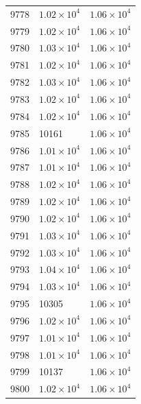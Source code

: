 \begin{table}[H]
\begin{tabular}{lll}
9778 & $\displaystyle 1.02 \times 10^{4}$ & $\displaystyle 1.06 \times 10^{4}$ \\
9779 & $\displaystyle 1.02 \times 10^{4}$ & $\displaystyle 1.06 \times 10^{4}$ \\
9780 & $\displaystyle 1.03 \times 10^{4}$ & $\displaystyle 1.06 \times 10^{4}$ \\
9781 & $\displaystyle 1.02 \times 10^{4}$ & $\displaystyle 1.06 \times 10^{4}$ \\
9782 & $\displaystyle 1.03 \times 10^{4}$ & $\displaystyle 1.06 \times 10^{4}$ \\
9783 & $\displaystyle 1.02 \times 10^{4}$ & $\displaystyle 1.06 \times 10^{4}$ \\
9784 & $\displaystyle 1.02 \times 10^{4}$ & $\displaystyle 1.06 \times 10^{4}$ \\
9785 & 10161 & $\displaystyle 1.06 \times 10^{4}$ \\
9786 & $\displaystyle 1.01 \times 10^{4}$ & $\displaystyle 1.06 \times 10^{4}$ \\
9787 & $\displaystyle 1.01 \times 10^{4}$ & $\displaystyle 1.06 \times 10^{4}$ \\
9788 & $\displaystyle 1.02 \times 10^{4}$ & $\displaystyle 1.06 \times 10^{4}$ \\
9789 & $\displaystyle 1.02 \times 10^{4}$ & $\displaystyle 1.06 \times 10^{4}$ \\
9790 & $\displaystyle 1.02 \times 10^{4}$ & $\displaystyle 1.06 \times 10^{4}$ \\
9791 & $\displaystyle 1.03 \times 10^{4}$ & $\displaystyle 1.06 \times 10^{4}$ \\
9792 & $\displaystyle 1.03 \times 10^{4}$ & $\displaystyle 1.06 \times 10^{4}$ \\
9793 & $\displaystyle 1.04 \times 10^{4}$ & $\displaystyle 1.06 \times 10^{4}$ \\
9794 & $\displaystyle 1.03 \times 10^{4}$ & $\displaystyle 1.06 \times 10^{4}$ \\
9795 & 10305 & $\displaystyle 1.06 \times 10^{4}$ \\
9796 & $\displaystyle 1.02 \times 10^{4}$ & $\displaystyle 1.06 \times 10^{4}$ \\
9797 & $\displaystyle 1.01 \times 10^{4}$ & $\displaystyle 1.06 \times 10^{4}$ \\
9798 & $\displaystyle 1.01 \times 10^{4}$ & $\displaystyle 1.06 \times 10^{4}$ \\
9799 & 10137 & $\displaystyle 1.06 \times 10^{4}$ \\
9800 & $\displaystyle 1.02 \times 10^{4}$ & $\displaystyle 1.06 \times 10^{4}$ \\

\end{tabular}
\end{table}
